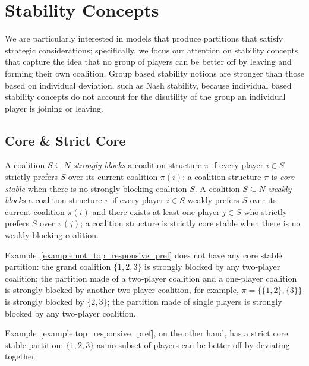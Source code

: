 \section{Stability Concepts}
\label{sec:stability_concepts}
We are particularly interested in models that produce partitions that satisfy
strategic considerations; specifically, we focus our attention on stability
concepts that capture the idea that no group of players can be better off by
leaving and forming their own coalition.
Group based stability notions are stronger than those based on individual deviation,
such as Nash stability, because individual based stability concepts do not account
for the disutility of the group an individual player is joining or leaving.

\subsection{Core \& Strict Core}
\label{subsec:core_strict_core}
A coalition $S \subseteq N$ \textit{strongly blocks} a coalition structure $\pi$
if every player $i \in S$ strictly prefers $S$ over its current coalition $\pi(i)$;
a coalition structure $\pi$ is \textit{core stable} when there is no strongly
blocking coalition $S$.
A coalition $S \subseteq N$ \textit{weakly blocks} a coalition structure $\pi$
if every player $i \in S$ weakly prefers $S$ over its current coalition $\pi(i)$
and there exists at least one player $j \in S$ who strictly prefers $S$
over $\pi(j)$; a coalition structure is strictly core stable when there is no
weakly blocking coalition.

Example~\ref{example:not_top_responsive_pref} does not have any core stable
partition: the grand coalition $\{1, 2, 3\}$ is strongly blocked by any two-player
coalition; the partition made of a two-player coalition and a one-player
coalition is strongly blocked by another two-player coalition, for example,
$\pi = \{\{1, 2\}, \{3\}\}$ is strongly blocked by $\{2, 3\}$; the partition made
of single players is strongly blocked by any two-player coalition.

Example~\ref{example:top_responsive_pref}, on the other hand, has a strict core
stable partition: $\{1, 2, 3\}$ as no subset of players can be better off by
deviating together.

